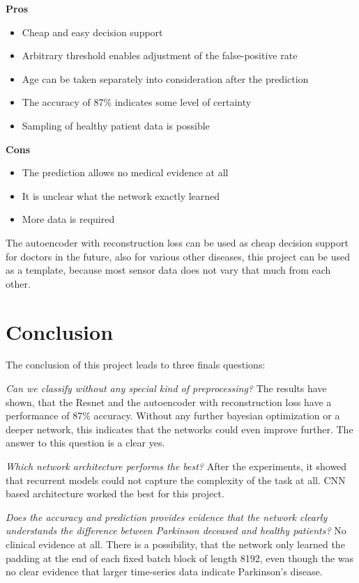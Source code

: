 \documentclass[journal]{IEEEtran}
\begin{document}
\textbf{Pros}
\begin{itemize}
\item Cheap and easy decision support
\item Arbitrary threshold enables adjustment of the false-positive rate
\item Age can be taken separately into consideration after the prediction
\item The accuracy of 87\% indicates some level of certainty
\item Sampling of healthy patient data is possible
\end{itemize}

\textbf{Cons}
\begin{itemize}
\item The prediction allows no medical evidence at all
\item It is unclear what the network exactly learned
\item More data is required
\end{itemize}

The autoencoder with reconstruction loss can be used as cheap decision support for doctors in the future, also for various other diseases, this project can be used as a template, because most sensor data does not vary that much from each other.


\section{Conclusion}
The conclusion of this project leads to three finals questions:

\textit{Can we classify without any special kind of preprocessing?}
The results have shown, that the Resnet and the autoencoder with reconstruction loss have a performance of 87\% accuracy. Without any further bayesian optimization or a deeper network, this indicates that the networks could even improve further. The answer to this question is a clear yes. 

\textit{Which network architecture performs the best?}
After the experiments, it showed that recurrent models could not capture the complexity of the task at all. CNN based architecture worked the best for this project.

\textit{Does the accuracy and prediction provides evidence that the network clearly understands the difference between Parkinson deceased and healthy patients?}
No clinical evidence at all. There is a possibility, that the network only learned the padding at the end of each fixed batch block of length 8192, even though the was no clear evidence that larger time-series data indicate Parkinson's disease.
\end{document}
